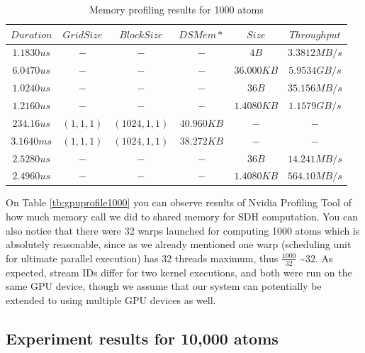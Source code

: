 \documentclass[11pt,a4paper]{report}
\begin{document}
\begin{table}[h!]
	\renewcommand*{\arraystretch}{1.5}
	\tabcolsep=0.12cm
  \centering
  \begin{tabular}{| c | c | c | c | c | c |}
   \hline

$Duration$ & $Grid Size$ & $Block Size$ & $DSMem*$ & $Size$ & $Throughput$ \\ \hline 
$1.1830us$ & $-$ & $-$ & $-$ & $4B$ & $3.3812MB/s$ \\ \hline 
$6.0470us$ & $-$ & $-$ & $-$ & $36.000KB$ & $5.9534GB/s$ \\ \hline 
$1.0240us$ & $-$ & $-$ & $-$ & $36B$ & $35.156MB/s$ \\ \hline 
$1.2160us$ & $-$ & $-$ & $-$ & $1.4080KB$ & $1.1579GB/s$ \\ \hline 
$234.16us$ & $(1,1,1)$ & $(1024,1,1)$ & $40.960KB$ & $-$ & $-$ \\ \hline 
$3.1640ms$ & $(1,1,1)$ & $(1024,1,1)$ & $38.272KB$ & $-$ & $-$ \\ \hline 
$2.5280us$ & $-$ & $-$ & $-$ & $36B$ & $14.241MB/s$ \\ \hline 
$2.4960us$ & $-$ & $-$ & $-$ & $1.4080KB$ & $564.10MB/s$ \\
	\hline

  \end{tabular}
    \caption{Memory profiling results for 1000 atoms}
    	  \label{tb:gpumem1000}
\end{table}

On Table \ref{tb:gpuprofile1000} you can observe results of Nvidia Profiling Tool of how much memory call we did to shared memory for SDH computation. You can also notice that there were 32 warps launched for computing 1000 atoms which is absolutely reasonable, since as we already mentioned one warp (scheduling unit for ultimate parallel execution) has 32 threads maximum, thus ${\frac{1000}{32}}$ \textasciitilde \space$32$. As expected, stream IDs differ for two kernel executions, and both were run on the same GPU device, though we assume that our system can potentially be extended to using multiple GPU devices as well.


\subsection{Experiment results for 10,000 atoms}
\end{document}
